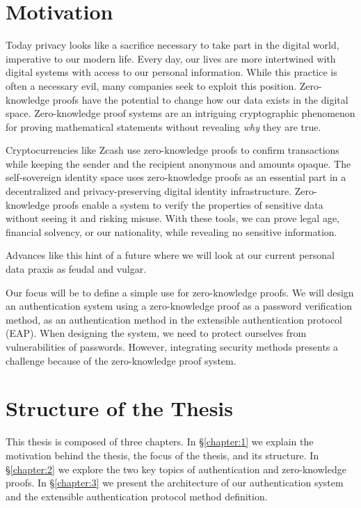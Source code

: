 \section{Motivation}
Today privacy looks like a sacrifice necessary to take part in the digital world, imperative to our modern life. 
Every day, our lives are more intertwined with digital systems with access to our personal information. While this practice is often a necessary evil, many companies seek to exploit this position.
Zero-knowledge proofs have the potential to change how our data exists in the digital space. 
Zero-knowledge proof systems are an intriguing cryptographic phenomenon for proving mathematical statements without revealing \textit{why} they are true.

Cryptocurrencies like Zcash \cite{hopwood2016zcash} use zero-knowledge proofs to confirm transactions while keeping the sender and the recipient anonymous and amounts opaque.
The self-sovereign identity space \cite{tobin2016inevitable} uses zero-knowledge proofs as an essential part in a decentralized and privacy-preserving digital identity infrastructure.
Zero-knowledge proofs enable a system to verify the properties \cite{10.1007/978-3-540-89255-7_15} of sensitive data without seeing it and risking misuse. With these tools, we can prove legal age, financial solvency, or our nationality, while revealing no sensitive information.

Advances like this hint of a future where we will look at our current personal data praxis as feudal and vulgar.

\bigskip
\noindent
Our focus will be to define a simple use for zero-knowledge proofs.
We will design an authentication system using a zero-knowledge proof as a password verification method, as an authentication method in the extensible authentication protocol (EAP).
When designing the system, we need to protect ourselves from vulnerabilities of passwords.
However, integrating security methods presents a challenge because of the zero-knowledge proof system.

\section{Structure of the Thesis}
This thesis is composed of three chapters.
In \S\ref{chapter:1} we explain the motivation behind the thesis, the focus of the thesis, and its structure.
In \S\ref{chapter:2} we explore the two key topics of authentication and zero-knowledge proofs.
In \S\ref{chapter:3} we present the architecture of our authentication system and the extensible authentication protocol method definition.


